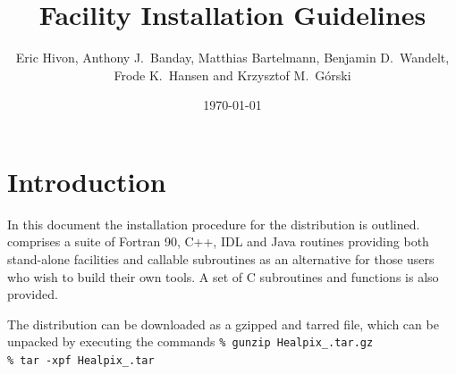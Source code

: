 \documentclass[12pt,twoside]{article}
\begin{document}
\title{\healpix Facility Installation Guidelines}
\author{Eric Hivon, Anthony J.~Banday, Matthias Bartelmann, Benjamin D.~Wandelt,
Frode K.~Hansen and Krzysztof M.~G\'orski}
\date{\today}

\frontpage
\tableofcontents
\newpage

\section{Introduction}

In this document the installation procedure for the \healpix
distribution is outlined. \healpix comprises a suite of Fortran 90, C++, 
IDL and Java routines
providing both stand-alone facilities and callable subroutines as an alternative
for those users who wish to build their own tools.
A set of C subroutines and functions is also provided. 

The distribution can be downloaded as a gzipped and tarred file,
which can be unpacked by executing the commands \hfill\newline
{\tt \% gunzip Healpix\_\hpxversion.tar.gz}\hfill\\
{\tt \% tar -xpf Healpix\_\hpxversion.tar}\hfill\\
\end{document}
